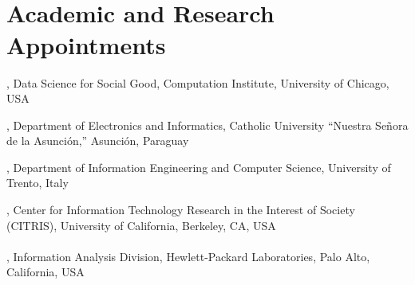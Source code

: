 
\section{\\Academic and Research Appointments}

, Data Science for Social Good, Computation Institute, University of Chicago, USA 

, Department of Electronics and Informatics, Catholic University ``Nuestra Señora de la Asunción,'' Asunción, Paraguay 

, Department of Information Engineering and Computer Science, University of Trento, Italy 

, Center for Information Technology Research in the Interest of Society (CITRIS), University of California, Berkeley, CA, USA \\\\
, Information Analysis Division, Hewlett-Packard Laboratories, Palo Alto, California, USA 
